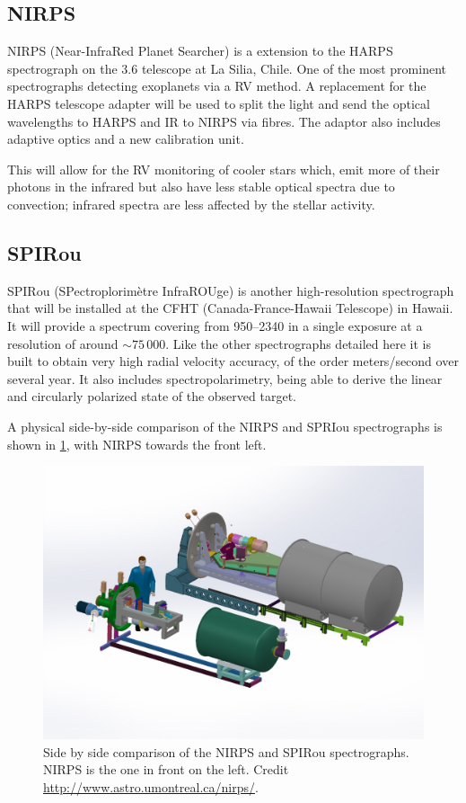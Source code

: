 \subsection{NIRPS}
\label{subsec:nirps}
{NIRPS} (Near-InfraRed Planet Searcher) is a \nir{} extension to the {HARPS} spectrograph on the 3.6\m{} telescope at La Silia, Chile.
One of the most prominent spectrographs detecting exoplanets via a RV method.
A replacement for the {HARPS} telescope adapter will be used to split the light and send the optical wavelengths to {HARPS} and {IR} to {NIRPS} via fibres.
The adaptor also includes adaptive optics and a new calibration unit.

This will allow for the RV monitoring of cooler stars which, emit more of their photons in the infrared but also have less stable optical spectra due to convection; infrared spectra are less affected by the stellar activity.

\subsection{SPIRou}
\label{subsec:spirou}
{SPIRou} (SPectroplorim\`etre InfraROUge) is another high-resolution \nir{} spectrograph that will be installed at the {CFHT} (Canada-France-Hawaii Telescope) in Hawaii.
It will provide a spectrum covering from 950--2340\nm{} in a single exposure at a resolution of around \(\sim75\,000\).
Like the other spectrographs detailed here it is built to obtain very high radial velocity accuracy, of the order meters/second over several year.
It also includes spectropolarimetry, being able to derive the linear and circularly polarized state of the observed target.

A physical side-by-side comparison of the {NIRPS} and {SPRIou} spectrographs is shown in \cref{fig:nirps-vs-spirou}, with {NIRPS} towards the front left.
\begin{figure}
    \centering
    \includegraphics[width=0.7\linewidth]{figures/spectroscopy/NIRPS-vs-SPIROU}
    \caption{Side by side comparison of the {NIRPS} and {SPIRou} spectrographs.
        {NIRPS} is the one in front on the left.
        Credit \href{http://www.astro.umontreal.ca/nirps/}{http://www.astro.umontreal.ca/nirps/}.}
    \label{fig:nirps-vs-spirou}
\end{figure}



